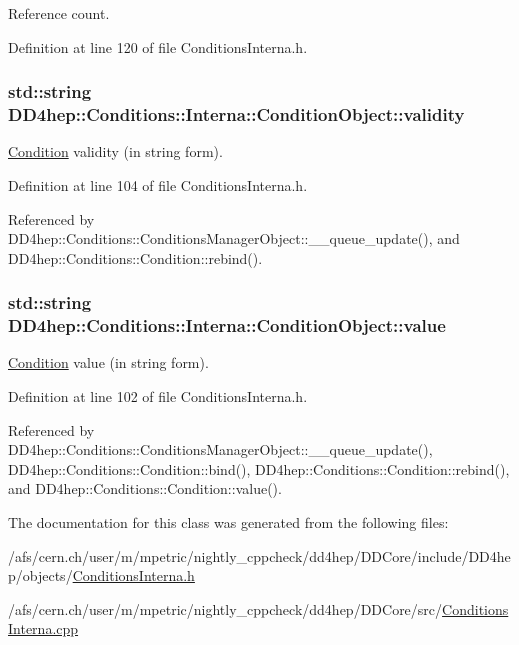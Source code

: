 Reference count. 

Definition at line 120 of file ConditionsInterna.h.\hypertarget{class_d_d4hep_1_1_conditions_1_1_interna_1_1_condition_object_a7f4bcc75be5d565396e3f09c91a23ede}{
\subsubsection[{validity}]{\setlength{\rightskip}{0pt plus 5cm}std::string {\bf DD4hep::Conditions::Interna::ConditionObject::validity}}}
\label{class_d_d4hep_1_1_conditions_1_1_interna_1_1_condition_object_a7f4bcc75be5d565396e3f09c91a23ede}


\hyperlink{class_d_d4hep_1_1_conditions_1_1_condition}{Condition} validity (in string form). 

Definition at line 104 of file ConditionsInterna.h.

Referenced by DD4hep::Conditions::ConditionsManagerObject::\_\-\_\-queue\_\-update(), and DD4hep::Conditions::Condition::rebind().\hypertarget{class_d_d4hep_1_1_conditions_1_1_interna_1_1_condition_object_a0b82a44322c732c5f5b99123eef28f63}{
\subsubsection[{value}]{\setlength{\rightskip}{0pt plus 5cm}std::string {\bf DD4hep::Conditions::Interna::ConditionObject::value}}}
\label{class_d_d4hep_1_1_conditions_1_1_interna_1_1_condition_object_a0b82a44322c732c5f5b99123eef28f63}


\hyperlink{class_d_d4hep_1_1_conditions_1_1_condition}{Condition} value (in string form). 

Definition at line 102 of file ConditionsInterna.h.

Referenced by DD4hep::Conditions::ConditionsManagerObject::\_\-\_\-queue\_\-update(), DD4hep::Conditions::Condition::bind(), DD4hep::Conditions::Condition::rebind(), and DD4hep::Conditions::Condition::value().

The documentation for this class was generated from the following files:\begin{DoxyCompactItemize}
\item 
/afs/cern.ch/user/m/mpetric/nightly\_\-cppcheck/dd4hep/DDCore/include/DD4hep/objects/\hyperlink{_d_d_core_2include_2_d_d4hep_2objects_2_conditions_interna_8h}{ConditionsInterna.h}\item 
/afs/cern.ch/user/m/mpetric/nightly\_\-cppcheck/dd4hep/DDCore/src/\hyperlink{_d_d_core_2src_2_conditions_interna_8cpp}{ConditionsInterna.cpp}\end{DoxyCompactItemize}
